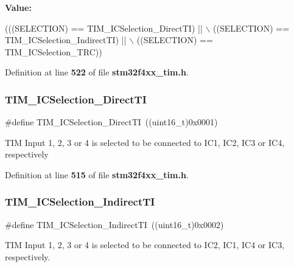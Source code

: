 {\bfseries Value\+:}
\begin{DoxyCode}
(((SELECTION) == TIM_ICSelection_DirectTI) || \(\backslash\)
                                        ((SELECTION) == 
      TIM_ICSelection_IndirectTI) || \(\backslash\)
                                        ((SELECTION) == TIM_ICSelection_TRC))
\end{DoxyCode}


Definition at line \textbf{ 522} of file \textbf{ stm32f4xx\+\_\+tim.\+h}.

\mbox{\label{group__TIM__Input__Capture__Selection_ga3d38876044457b7faefe951d367ac8c3}} 
\subsubsection{T\+I\+M\+\_\+\+I\+C\+Selection\+\_\+\+Direct\+TI}
{\footnotesize\ttfamily \#define T\+I\+M\+\_\+\+I\+C\+Selection\+\_\+\+Direct\+TI~((uint16\+\_\+t)0x0001)}

T\+IM Input 1, 2, 3 or 4 is selected to be connected to I\+C1, I\+C2, I\+C3 or I\+C4, respectively 

Definition at line \textbf{ 515} of file \textbf{ stm32f4xx\+\_\+tim.\+h}.

\mbox{\label{group__TIM__Input__Capture__Selection_ga2289b684133ac0b81ddfcd860d01b144}} 
\subsubsection{T\+I\+M\+\_\+\+I\+C\+Selection\+\_\+\+Indirect\+TI}
{\footnotesize\ttfamily \#define T\+I\+M\+\_\+\+I\+C\+Selection\+\_\+\+Indirect\+TI~((uint16\+\_\+t)0x0002)}

T\+IM Input 1, 2, 3 or 4 is selected to be connected to I\+C2, I\+C1, I\+C4 or I\+C3, respectively. 

